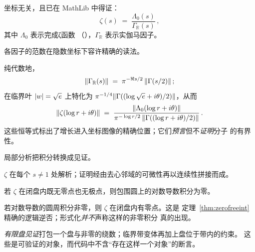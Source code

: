 \begin{theorem}\label{thm:decomp}
坐标无关，且已在 MathLib 中得证：
\[
  \zeta(s) \;=\; \frac{\Lambda_{0}(s)}{\Gamma_{\mathbb{R}}(s)}\, ,
\]
其中 $\Lambda_{0}$ 表示完成ζ函数
（），$\Gamma_{\mathbb{R}}$ 表示实伽马因子。
\end{theorem}

各因子的范数在隐数坐标下容许精确的读法。

\begin{proposition}\label{prop:normread}
纯代数地，
\[
  \lVert \Gamma_{\mathbb{R}}(s)\rVert
  \;=\; \pi^{-\Re s/2}\,\lVert \Gamma(s/2)\rVert\, ;
\]
在临界叶 $\lvert w\rvert=\sqrt{e}$ 上特化为
$\pi^{-1/4}\lVert \Gamma((\log\sqrt{e}+i\theta)/2)\rVert$，从而
\[
  \lVert \zeta(\log r+i\theta)\rVert
  \;=\;
  \frac{\lVert \Lambda_{0}(\log r+i\theta)\rVert}
       {\pi^{-\log r/2}\,\lVert \Gamma((\log r+i\theta)/2)\rVert}\, .
\]
这些恒等式标出了增长进入坐标图像的精确位置；它们\emph{预言}但不\emph{证明}分子
的有界性。
\end{proposition}

局部分析把积分转换成见证。

\begin{proposition}\label{prop:analytic}
$\zeta$ 在每个 $s\neq 1$ 处解析；证明经由去心邻域的可微性再以连续性拼接而成。
\end{proposition}

\begin{theorem}
\label{thm:zerofreeint}
若 $\zeta$ 在闭盘内既无零点也无极点，则包围圆上的对数导数积分为零。
\end{theorem}

\begin{theorem}
\label{thm:existbridge}
若对数导数的圆周积分非零，则 $\zeta$ 在闭盘内有零点。这是
定理~\ref{thm:zerofreeint} 精确的逻辑逆否；形式化\emph{并不}声称这样的非零积分
真的出现。
\end{theorem}

\begin{definition}\label{def:witness}
\emph{有限盘见证}打包一个盘与非零的绕数；临界带变体再加上盘位于带内的约束。
这些是可验证的对象，而代码中不含“存在这样一个对象”的断言。
\end{definition}


